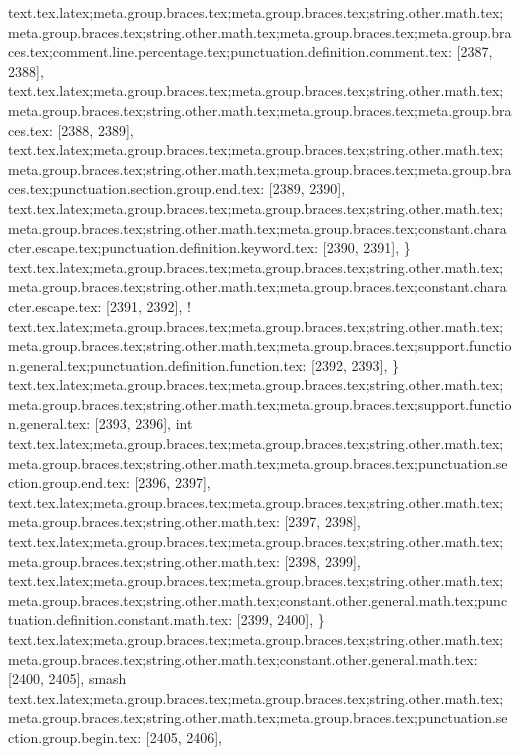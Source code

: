 {{{{{{{{{{{{{{{{{{{{{{{{{{{{{{{{{{{{{{{{{{{{{{{{{{{{{{{{{{{{{{{{{{{{{{{{{{{{{{{{{{{{{text.tex.latex;meta.group.braces.tex;meta.group.braces.tex;string.other.math.tex;meta.group.braces.tex;string.other.math.tex;meta.group.braces.tex;meta.group.braces.tex;comment.line.percentage.tex;punctuation.definition.comment.tex: [2387, 2388], {%
text.tex.latex;meta.group.braces.tex;meta.group.braces.tex;string.other.math.tex;meta.group.braces.tex;string.other.math.tex;meta.group.braces.tex;meta.group.braces.tex: [2388, 2389], {
}
text.tex.latex;meta.group.braces.tex;meta.group.braces.tex;string.other.math.tex;meta.group.braces.tex;string.other.math.tex;meta.group.braces.tex;meta.group.braces.tex;punctuation.section.group.end.tex: [2389, 2390], {}}
text.tex.latex;meta.group.braces.tex;meta.group.braces.tex;string.other.math.tex;meta.group.braces.tex;string.other.math.tex;meta.group.braces.tex;constant.character.escape.tex;punctuation.definition.keyword.tex: [2390, 2391], {\}
text.tex.latex;meta.group.braces.tex;meta.group.braces.tex;string.other.math.tex;meta.group.braces.tex;string.other.math.tex;meta.group.braces.tex;constant.character.escape.tex: [2391, 2392], {!}
text.tex.latex;meta.group.braces.tex;meta.group.braces.tex;string.other.math.tex;meta.group.braces.tex;string.other.math.tex;meta.group.braces.tex;support.function.general.tex;punctuation.definition.function.tex: [2392, 2393], {\}
text.tex.latex;meta.group.braces.tex;meta.group.braces.tex;string.other.math.tex;meta.group.braces.tex;string.other.math.tex;meta.group.braces.tex;support.function.general.tex: [2393, 2396], {int}
text.tex.latex;meta.group.braces.tex;meta.group.braces.tex;string.other.math.tex;meta.group.braces.tex;string.other.math.tex;meta.group.braces.tex;punctuation.section.group.end.tex: [2396, 2397], {}}
text.tex.latex;meta.group.braces.tex;meta.group.braces.tex;string.other.math.tex;meta.group.braces.tex;string.other.math.tex: [2397, 2398], {
}
text.tex.latex;meta.group.braces.tex;meta.group.braces.tex;string.other.math.tex;meta.group.braces.tex;string.other.math.tex: [2398, 2399], {
}
text.tex.latex;meta.group.braces.tex;meta.group.braces.tex;string.other.math.tex;meta.group.braces.tex;string.other.math.tex;constant.other.general.math.tex;punctuation.definition.constant.math.tex: [2399, 2400], {\}
text.tex.latex;meta.group.braces.tex;meta.group.braces.tex;string.other.math.tex;meta.group.braces.tex;string.other.math.tex;constant.other.general.math.tex: [2400, 2405], {smash}
text.tex.latex;meta.group.braces.tex;meta.group.braces.tex;string.other.math.tex;meta.group.braces.tex;string.other.math.tex;meta.group.braces.tex;punctuation.section.group.begin.tex: [2405, 2406], {{}
}}}}}}}}}}}}}}}}}}}}}}}}}}}}}}}}}}}}}}}}}}}}}}}}}}}}}}}}}}}}}}}}}}}}}}}}}}}}}}}}}}}}}}}}
